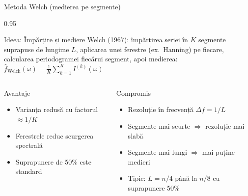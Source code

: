 \documentclass[9pt, aspectratio=169, t]{beamer}
\begin{document}
\begin{frame}{Metoda Welch (medierea pe segmente)}
    \begin{cminipage}{0.95\textwidth}
    \vspace{-2mm}
    \begin{block}{Ideea: Împărțire și mediere}
        {\small Welch (1967): împărțirea seriei în $K$ segmente suprapuse de lungime $L$, aplicarea unei ferestre (ex.\ Hanning) pe fiecare, calcularea periodogramei fiecărui segment, apoi medierea:
        $\hat{f}_{\text{Welch}}(\omega) = \frac{1}{K}\sum_{k=1}^{K} I^{(k)}(\omega)$}
    \end{block}
    \vspace{-2mm}
    \begin{columns}[T]
        \begin{exampleblock}{Avantaje}
            \begin{itemize}\setlength{\itemsep}{0pt}
                \item Varianța redusă cu factorul $\approx 1/K$
                \item Ferestrele reduc scurgerea spectrală
                \item Suprapunere de 50\% este standard
            \end{itemize}
        \end{exampleblock}

        \begin{alertblock}{Compromis}
            \begin{itemize}\setlength{\itemsep}{0pt}
                \item Rezoluție în frecvență $\Delta f = 1/L$
                \item Segmente mai scurte $\Rightarrow$ rezoluție mai slabă
                \item Segmente mai lungi $\Rightarrow$ mai puține medieri
                \item Tipic: $L = n/4$ până la $n/8$ cu suprapunere 50\%
            \end{itemize}
        \end{alertblock}
    \end{columns}
    \end{cminipage}
\end{frame}
\end{document}
